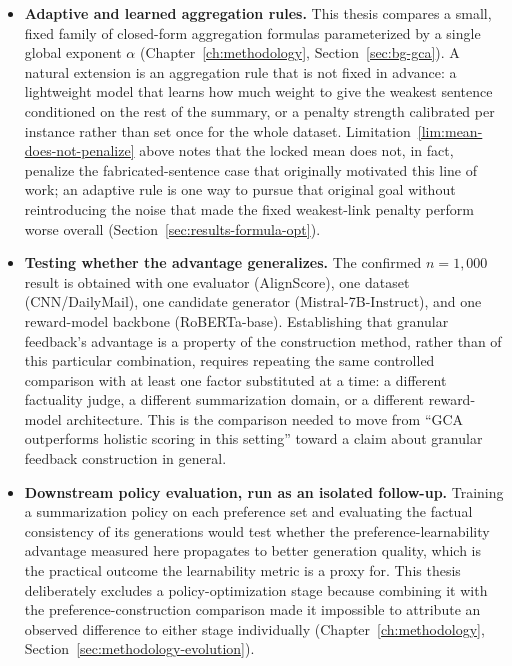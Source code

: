 \begin{itemize}
  \item \textbf{Adaptive and learned aggregation rules.} This thesis compares
    a small, fixed family of closed-form aggregation formulas parameterized
    by a single global exponent $\alpha$ (Chapter~\ref{ch:methodology},
    Section~\ref{sec:bg-gca}). A natural extension is an aggregation rule
    that is not fixed in advance: a lightweight model that learns how much
    weight to give the weakest sentence conditioned on the rest of the
    summary, or a penalty strength calibrated per instance rather than set
    once for the whole dataset. Limitation~\ref{lim:mean-does-not-penalize}
    above notes that the locked mean does not, in fact, penalize the
    fabricated-sentence case that originally motivated this line of work;
    an adaptive rule is one way to
    pursue that original goal without reintroducing the noise that made the
    fixed weakest-link penalty perform worse overall
    (Section~\ref{sec:results-formula-opt}).
  \item \textbf{Testing whether the advantage generalizes.} The confirmed
    $n=1{,}000$ result is obtained with one evaluator (AlignScore), one
    dataset (CNN/DailyMail), one candidate generator (Mistral-7B-Instruct),
    and one reward-model backbone (RoBERTa-base). Establishing that granular
    feedback's advantage is a property of the construction method, rather
    than of this particular combination, requires repeating the same
    controlled comparison with at least one factor substituted at a time:
    a different factuality judge, a different summarization domain, or a
    different reward-model architecture. This is the comparison needed to
    move from ``GCA outperforms holistic scoring in this setting'' toward
    a claim about granular feedback construction in general.
  \item \textbf{Downstream policy evaluation, run as an isolated follow-up.}
    Training a summarization policy on each preference set and evaluating
    the factual consistency of its generations would test whether the
    preference-learnability advantage measured here propagates to better
    generation quality, which is the practical outcome the learnability
    metric is a proxy for. This thesis deliberately excludes a
    policy-optimization stage because combining it with the
    preference-construction comparison made it impossible to attribute an
    observed difference to either stage individually
    (Chapter~\ref{ch:methodology}, Section~\ref{sec:methodology-evolution}).

\end{itemize}
